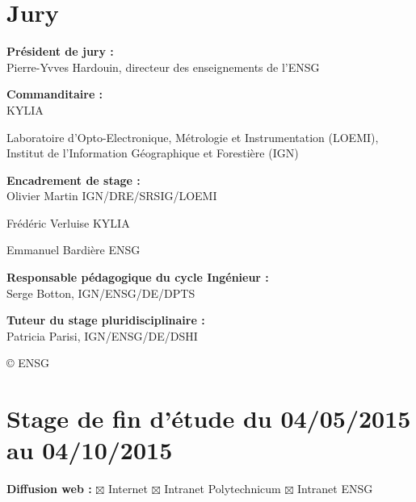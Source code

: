 \newevenpage
\thispagestyle{plain}
\section*{Jury}
\vspace{0.5cm}

\textbf{Président de jury :} \\

Pierre-Yvves Hardouin, directeur des enseignements de l'ENSG

\vspace{0.5cm}

\textbf{Commanditaire :} \\

KYLIA


Laboratoire d’Opto-Electronique, Métrologie et Instrumentation (LOEMI), Institut de l’Information Géographique et Forestière (IGN)

\vspace{0.5cm}

\textbf{Encadrement de stage :} \\ 

Olivier Martin IGN/DRE/SRSIG/LOEMI

Frédéric Verluise KYLIA

Emmanuel Bardière ENSG

\vspace{0.5cm}

\textbf{Responsable pédagogique du cycle Ingénieur :} \\

Serge Botton, IGN/ENSG/DE/DPTS

\vspace{0.5cm}

\textbf{Tuteur du stage pluridisciplinaire :} \\

Patricia Parisi, IGN/ENSG/DE/DSHI

\vspace{1cm}

\copyright \hspace{0.3cm} ENSG

\section*{Stage de fin d'étude du 04/05/2015 au 04/10/2015 }
\vspace{0.3cm}
\textbf{Diffusion web :} $\boxtimes$ Internet \hspace{0.2cm}$\boxtimes$ Intranet Polytechnicum\hspace{0.2cm}
$\boxtimes$ Intranet ENSG\vspace{0.3cm}

